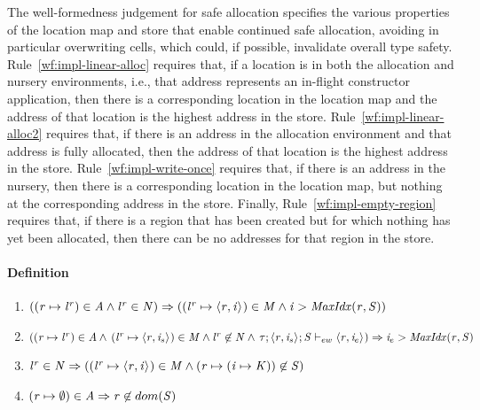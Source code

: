 \documentclass[showabstract,showacknowledgments,showpreface,showdedication]{iuphd}
\theoremstyle{nonumberplain}
\begin{document}
The well-formedness judgement for safe allocation specifies the various properties
of the location map and store that enable continued safe allocation, avoiding in particular
overwriting cells, which could, if possible, invalidate overall type safety.
%
Rule~\ref{wf:impl-linear-alloc} requires that, if a location is in both the allocation
and nursery environments, i.e., that address represents an in-flight
constructor application, then there is a corresponding location in the location
map and the address of that location is the highest address in the store.
%
Rule~\ref{wf:impl-linear-alloc2} requires that, if there is an address in the allocation
environment and that address is fully allocated, then the address of that location is the
highest address in the store.
%
Rule~\ref{wf:impl-write-once} requires that, if there is an address in the nursery, then
there is a corresponding location in the location map, but nothing at the corresponding
address in the store.
%
Finally, Rule~\ref{wf:impl-empty-region} requires that, if there is a region that has been
created but for which nothing has yet been allocated, then there can be no addresses
for that region in the store.

\paragraph{Definition}

\begin{enumerate}
    \item \label{wf:impl-linear-alloc} $ ((\mathit{r} \mapsto {\mathit{l}}^{\mathit{r}}) \in \mathit{A} \wedge {\mathit{l}}^{\mathit{r}} \in \mathit{N}) \Rightarrow \\
          (({\mathit{l}}^{\mathit{r}} \mapsto \langle \mathit{r}, \mathit{i} \rangle ^{}) \in \mathit{M} \wedge
          \mathit{i} > \mathit{MaxIdx}(\mathit{r},\mathit{S}))
          $

    \item \label{wf:impl-linear-alloc2} $ ((\mathit{r} \mapsto {\mathit{l}}^{\mathit{r}}) \in \mathit{A} \wedge 
    \, ({\mathit{l}}^{\mathit{r}} \mapsto \langle \mathit{r}, \mathit{i}_s \rangle ^{}) \in \mathit{M} \wedge {\mathit{l}}^{\mathit{r}} \not \in \mathit{N} \wedge
    \, \mathit{\tau};\langle \mathit{r}, \mathit{i}_s \rangle ^{};\mathit{S} \vdash_{ew} \langle \mathit{r}, \mathit{i}_e \rangle ^{}) \Rightarrow \\
          \mathit{i}_e > \mathit{MaxIdx}(\mathit{r},\mathit{S})
          $

    \item \label{wf:impl-write-once} $ {\mathit{l}}^{\mathit{r}} \in \mathit{N} \Rightarrow \\
          (({\mathit{l}}^{\mathit{r}} \mapsto \langle \mathit{r}, \mathit{i} \rangle ^{}) \in \mathit{M} \wedge \\
          (\mathit{r} \mapsto (\mathit{i} \mapsto \mathit{K})) \not \in \mathit{S})
          $

    \item \label{wf:impl-empty-region} $(\mathit{r} \mapsto \emptyset) \in \mathit{A} \Rightarrow \\
    \mathit{r} \not \in dom(\mathit{S})$
\end{enumerate}
\end{document}
